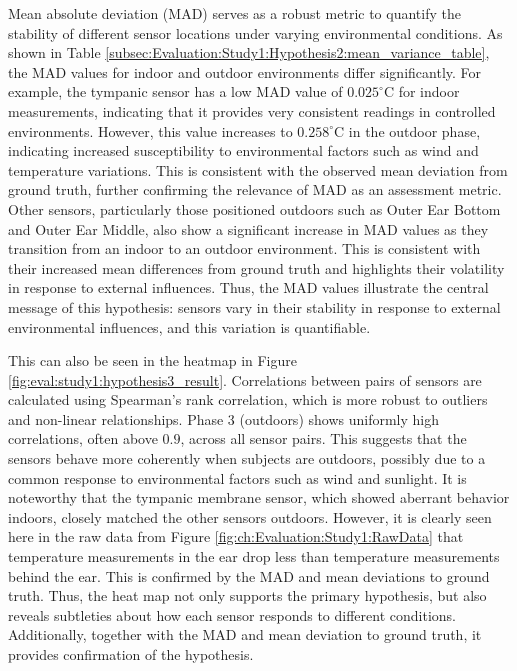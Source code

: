 Mean absolute deviation (MAD) serves as a robust metric to quantify the stability of different sensor locations under varying environmental conditions. 
As shown in Table \ref{subsec:Evaluation:Study1:Hypothesis2:mean_variance_table}, the MAD values for indoor and outdoor environments differ significantly. 
For example, the tympanic sensor has a low MAD value of \(0.025 ^\circ\text{C}\) for indoor measurements, indicating that it provides very consistent readings in controlled environments. 
However, this value increases to \(0.258 ^\circ\text{C}\) in the outdoor phase, indicating increased susceptibility to environmental factors such as wind and temperature variations. 
This is consistent with the observed mean deviation from ground truth, further confirming the relevance of MAD as an assessment metric. 
Other sensors, particularly those positioned outdoors such as Outer Ear Bottom and Outer Ear Middle, also show a significant increase in MAD values as they transition from an indoor to an outdoor environment. 
This is consistent with their increased mean differences from ground truth and highlights their volatility in response to external influences. 
Thus, the MAD values illustrate the central message of this hypothesis: sensors vary in their stability in response to external environmental influences, and this variation is quantifiable.

This can also be seen in the heatmap in Figure \ref{fig:eval:study1:hypothesis3_result}.  
Correlations between pairs of sensors are calculated using Spearman's rank correlation, which is more robust to outliers and non-linear relationships.  
Phase 3 (outdoors) shows uniformly high correlations, often above \(0.9\), across all sensor pairs.  
This suggests that the sensors behave more coherently when subjects are outdoors, possibly due to a common response to environmental factors such as wind and sunlight.  
It is noteworthy that the tympanic membrane sensor, which showed aberrant behavior indoors, closely matched the other sensors outdoors.
However, it is clearly seen here in the raw data from Figure \ref{fig:ch:Evaluation:Study1:RawData} that temperature measurements in the ear drop less than temperature measurements behind the ear. 
This is confirmed by the MAD and mean deviations to ground truth. 
Thus, the heat map not only supports the primary hypothesis, but also reveals subtleties about how each sensor responds to different conditions.
Additionally, together with the MAD and mean deviation to ground truth, it provides confirmation of the hypothesis.

